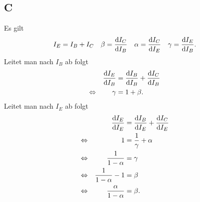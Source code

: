 \documentclass[a4paper,10pt]{article}
\numberwithin{equation}{section}
\begin{document}
\subsection{C}
Es gilt 
\begin{align} 
        I_E&=I_B+I_C&\beta &=\diff[]{I_C}{I_B}&\alpha &=\diff[]{I_C}{I_E}&\gamma &=\diff[]{I_E}{I_B}
.\end{align} 
Leitet man nach $I_B$ ab folgt 
\begin{align} 
        &&\diff[]{I_E}{I_B}&=\diff[]{I_B}{I_B}+\diff[]{I_C}{I_B}&&\\
        \Leftrightarrow &&\gamma &=1+\beta .&&
\end{align} 
Leitet man nach $I_E$ ab folgt
\begin{align} 
        &&\diff[]{I_E}{I_E}&=\diff[]{I_B}{I_E}+\diff[]{I_C}{I_E}&&\\
        \Leftrightarrow &&1&=\dfrac{1}{\gamma }+\alpha &&\nonumber \\
        \Leftrightarrow &&\dfrac{1}{1-\alpha }&=\gamma &&\nonumber \\
        \Leftrightarrow &&\dfrac{1}{1-\alpha }-1&=\beta &&\nonumber \\
        \Leftrightarrow &&\dfrac{\alpha }{1-\alpha }&=\beta .&&
\end{align} 
\end{document}
